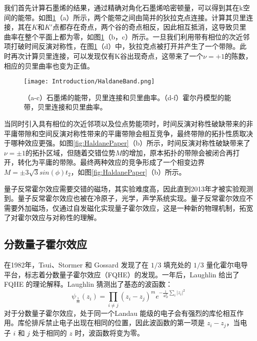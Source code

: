 我们首先计算石墨烯的结果，通过精确对角化石墨烯哈密顿量，可以得到其在k空间的能带。如图\ref{fig:HaldaneBand}（a）所示，两个能带之间由简并的狄拉克点连接。计算其贝里连接，其在$K$和$K'$点都存在奇点，两个谷的奇点相反，因此相互抵消，这导致贝里曲率在整个平面上都为零，如图\ref{fig:HaldaneBand}（b，c）所示。一旦我们利用带有相位的次近邻项打破时间反演对称性，在图\ref{fig:HaldaneBand}（d）中，狄拉克点被打开并产生了一个带隙。此时再次计算贝里连接，可以发现仅有K谷出现奇点，这带来了一个$\nu=+1$的陈数，相应的贝里曲率也变为正值。

\begin{figure}
    \centering
    \texttt{[image: Introduction/HaldaneBand.png]}
    \caption{（a-c）石墨烯的能带，贝里连接和贝里曲率。（d-f）霍尔丹模型的能带，贝里连接和贝里曲率。}
    \label{fig:HaldaneBand}
\end{figure}

当同时引入具有相位的次近邻项以及位点势能项时，时间反演对称性破缺带来的非平庸带隙和空间反演对称性带来的平庸带隙会相互竞争，最终带隙的拓扑性质取决于哪种效应更强。如图\ref{fig:HaldanePaper}（b）所示，时间反演对称性破缺带来了$\nu=\pm1$的拓扑区域，但随着交错位势$M$的增加，原本拓扑的带隙会被闭合再打开，转化为平庸的带隙。最终两种效应的竞争形成了一个相变边界$M=\pm3\sqrt{3}sin(\phi)t_2$，如图\ref{fig:HaldanePaper}（b）所示。

量子反常霍尔效应需要交错的磁场，其实验难度高，因此直到2013年才被实验观测到\cite{chang2013experimental}。量子反常霍尔效应也被在冷原子\cite{jotzu2014experimental}，光学\cite{mittal2019photonic,liu2021gain}，声学\cite{li2018weyl}系统实现。量子反常霍尔效应不需要外加磁场，仅通过自发磁化实现量子霍尔效应，这是一种新的物理机制，拓宽了对霍尔效应与对称性的理解。

\subsection{分数量子霍尔效应}

在1982年，Tsui、Stormer 和 Gossard 发现了在 $1/3$ 填充处的 $1/3$ 量化霍尔电导平台\cite{PhysRevLett.48.1559}，标志着分数量子霍尔效应（FQHE）的发现。一年后，Laughlin 给出了 FQHE 的理论解释\cite{PhysRevLett.50.1395}。Laughlin 猜测出了基态的波函数：
\begin{equation}
    \psi_{\frac{1}{m}}\left(z_i\right)=\prod_{i \neq j}\left(z_i-z_j\right)^m e^{-\frac{1}{4 l_B^2} \sum_i\left|z_i\right|^2}
\end{equation}
对于分数量子霍尔效应，处于同一个Landau 能级的电子会有强烈的库伦相互作用。库伦排斥禁止电子出现在相同的位置，因此波函数的第一项是 $z_i-z_j$，当电子 $i$ 和 $j$ 处于相同的 $z$ 时，波函数将变为零。

